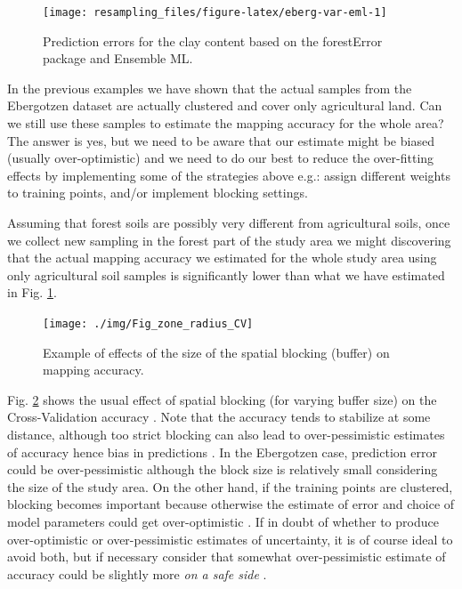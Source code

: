 \documentclass[
  graybox,natbib,nospthms]{svmono}
\begin{document}
\begin{figure}

{\centering \texttt{[image: resampling\_files/figure-latex/eberg-var-eml-1]} 

}

\caption{Prediction errors for the clay content based on the forestError package and Ensemble ML.}\label{fig:eberg-var-eml}
\end{figure}

In the previous examples we have shown that the actual samples from the Ebergotzen
dataset are actually clustered and cover only agricultural land. Can we
still use these samples to estimate the mapping accuracy for the whole area?
The answer is yes, but we need to be aware that our estimate might be biased
(usually over-optimistic) and we need to do our best to reduce the over-fitting
effects by implementing some of the strategies above e.g.: assign different
weights to training points, and/or implement blocking settings.

Assuming that forest soils are possibly very different from agricultural
soils, once we collect new sampling in the forest part of the study area we
might discovering that the actual mapping accuracy we estimated for the whole
study area using only agricultural soil samples is significantly lower than what
we have estimated in Fig. \ref{fig:eberg-var-eml}.

\begin{figure}

{\centering \texttt{[image: ./img/Fig\_zone\_radius\_CV]} 

}

\caption{Example of effects of the size of the spatial blocking (buffer) on mapping accuracy.}\label{fig:example-cv}
\end{figure}

Fig. \ref{fig:example-cv} shows the usual effect of spatial blocking (for varying buffer size) on the
Cross-Validation accuracy \citep{pohjankukka2017estimating}. Note that the accuracy
tends to stabilize at some distance, although too strict blocking can also lead
to over-pessimistic estimates of accuracy hence bias in predictions \citep[@][]{Wadoux2021EM}.
In the Ebergotzen case, prediction error could be over-pessimistic although the
block size is relatively small considering the size of the study area.
On the other hand, if the training points are clustered, blocking becomes
important because otherwise the estimate of error and choice of model parameters
could get over-optimistic \citep{meyer2018improving, lovelace2019geocomputation}.
If in doubt of whether to produce over-optimistic or over-pessimistic estimates of
uncertainty, it is of course ideal to avoid both, but if necessary consider that
somewhat over-pessimistic estimate of accuracy could be slightly more \emph{on a safe side} \citep{roberts2017cross}.
\end{document}
